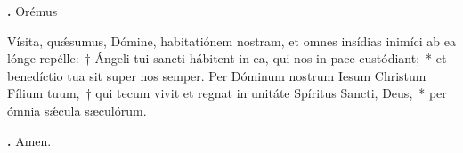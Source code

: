\textbf{\Vbar.} Orémus

Vísita, qu\'{\ae}sumus, Dómine, habitatiónem nostram, et omnes insídias inimíci ab ea lónge repélle:~†  Ángeli tui sancti hábitent in ea, qui nos in pace custódiant;~* et benedíctio tua sit super nos semper.
Per Dóminum nostrum Iesum Christum Fílium tuum,~† qui tecum vivit et regnat in unitáte Spíritus Sancti, Deus,~* per ómnia s\'{\ae}cula sæculórum.

\textbf{\Rbar.} Amen.

